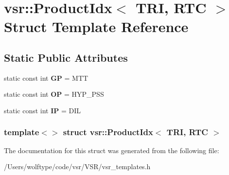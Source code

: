 \hypertarget{structvsr_1_1_product_idx_3_01_t_r_i_00_01_r_t_c_01_4}{\section{vsr\-:\-:Product\-Idx$<$ T\-R\-I, R\-T\-C $>$ Struct Template Reference}
\label{structvsr_1_1_product_idx_3_01_t_r_i_00_01_r_t_c_01_4}
}
\subsection*{Static Public Attributes}
\begin{DoxyCompactItemize}
\item 
\hypertarget{structvsr_1_1_product_idx_3_01_t_r_i_00_01_r_t_c_01_4_a4293694b1abda014fb3372ee3a1e32f9}{static const int {\bfseries G\-P} = M\-T\-T}\label{structvsr_1_1_product_idx_3_01_t_r_i_00_01_r_t_c_01_4_a4293694b1abda014fb3372ee3a1e32f9}

\item 
\hypertarget{structvsr_1_1_product_idx_3_01_t_r_i_00_01_r_t_c_01_4_a800e45aed514195d27bb591781ab9ddb}{static const int {\bfseries O\-P} = H\-Y\-P\-\_\-\-P\-S\-S}\label{structvsr_1_1_product_idx_3_01_t_r_i_00_01_r_t_c_01_4_a800e45aed514195d27bb591781ab9ddb}

\item 
\hypertarget{structvsr_1_1_product_idx_3_01_t_r_i_00_01_r_t_c_01_4_af141e0b8767b581f00efdff4257c7ba3}{static const int {\bfseries I\-P} = D\-I\-L}\label{structvsr_1_1_product_idx_3_01_t_r_i_00_01_r_t_c_01_4_af141e0b8767b581f00efdff4257c7ba3}

\end{DoxyCompactItemize}
\subsubsection*{template$<$$>$ struct vsr\-::\-Product\-Idx$<$ T\-R\-I, R\-T\-C $>$}



The documentation for this struct was generated from the following file\-:\begin{DoxyCompactItemize}
\item 
/\-Users/wolftype/code/vsr/\-V\-S\-R/vsr\-\_\-templates.\-h\end{DoxyCompactItemize}
